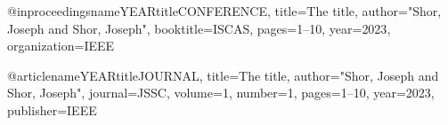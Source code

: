 
@inproceedings{nameYEARtitleCONFERENCE,
  title={The title},
  author="Shor, Joseph and Shor, Joseph",
  booktitle=ISCAS,
  pages={1--10},
  year={2023},
  organization={IEEE}
}

@article{nameYEARtitleJOURNAL,
  title={The title},
  author="Shor, Joseph and Shor, Joseph",
  journal=JSSC,
  volume={1},
  number={1},
  pages={1--10},
  year={2023},
  publisher={IEEE}
}
